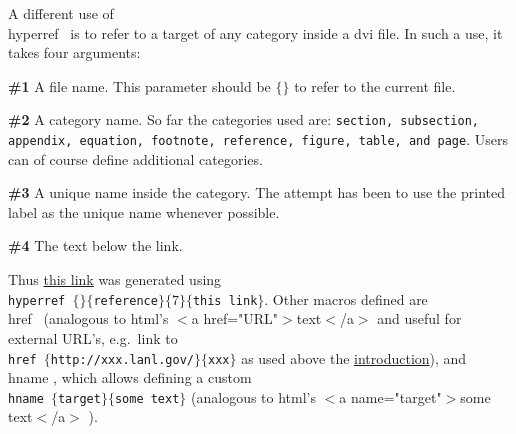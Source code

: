 A different use of \\hyperref \ is to refer to a target of
any category inside a dvi file. In such a use, it takes four arguments:
 \item{\bf\#1} A file name. This parameter should be $\{\}$ to refer to
                 the current file.
 \item{\bf\#2} A category name. So far the categories used are: {\tt section,
                 subsection, appendix, equation, footnote, reference, 
                 figure, table, and page}. 
               Users can of course define additional categories.
 \item{\bf\#3} A unique name inside the category. The attempt has been
                 to use the printed label as the unique name whenever
                 possible.
 \item{\bf\#4} The text below the link.

\noindent
Thus \hyperref{}{reference}{7}{this link} was generated using {\tt \\hyperref
$\{\}\{$reference$\}\{7\}\{$this link$\}$}.
\bigskip
Other macros defined are \\href \ (analogous to 
html's $<$a href="URL"$>$text$<$/a$>$
and useful for external URL's, e.g.\
link to {\tt \\href $\{$http://xxx.lanl.gov/$\}\{$xxx$\}$} as used above
the \hyperref{}{section}{1}{introduction}), and
\\hname , which allows defining a custom 
{\tt \\hname $\{$target$\}\{$some text$\}$}
(analogous to html's $<$a name="target"$>$some text$<$/a$>$ ).


\listrefs
\listfigs   %
\bye
